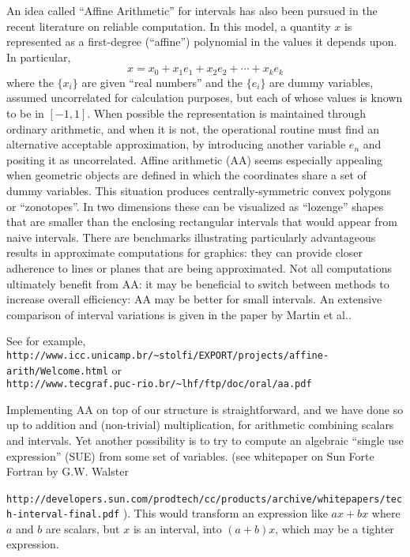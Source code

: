 \documentclass{article}
\begin{document}
An idea called ``Affine Arithmetic'' for intervals has also been
pursued in the recent literature on reliable computation.  In this
model, a quantity $x$ is represented as a first-degree (``affine'')
polynomial in the values it depends upon.  In particular, $$x=x_0+
x_1e_1+x_2e_2+ \cdots + x_k e_k$$ where the $\{x_i\}$ are given ``real
numbers'' and the $\{e_i\}$ are dummy variables, assumed uncorrelated
for calculation purposes, but each of whose values is known to be in
$[-1,1]$.  When possible the representation is maintained through
ordinary arithmetic, and when it is not, the operational routine must
find an alternative acceptable approximation, by introducing another
variable $e_{n}$ and positing it as uncorrelated.  Affine arithmetic
(AA) seems especially appealing when geometric objects are defined in
which the coordinates share a set of dummy variables.  This situation
produces centrally-symmetric convex polygons or ``zonotopes''.  In two
dimensions these can be visualized as ``lozenge'' shapes that are
smaller than the enclosing rectangular intervals that would appear
from naive intervals. There are benchmarks illustrating particularly
advantageous results in approximate computations for graphics: they
can provide closer adherence to lines or planes that are being
approximated. Not all computations ultimately benefit from AA:
it may be beneficial to switch between methods to
increase overall efficiency: AA may be better for small
intervals.  An extensive comparison of interval variations is given in
the paper by Martin et al.\cite{martin}.


See for example,\\
 \verb|http://www.icc.unicamp.br/~stolfi/EXPORT/projects/affine-arith/Welcome.html|
or\\
\verb|http://www.tecgraf.puc-rio.br/~lhf/ftp/doc/oral/aa.pdf|

Implementing AA on top of our structure is straightforward, and we
have done so up to addition and (non-trivial) multiplication, for
arithmetic combining scalars and intervals.  Yet another possibility
is to try to compute an algebraic ``single use expression'' (SUE) from
some set of variables. (see whitepaper on Sun Forte Fortran by
G.W. Walster\\ {\tt
http://developers.sun.com/prodtech/cc/products/archive/whitepapers/tech-interval-final.pdf}
).  This would transform an expression like $ax+bx$ where $a$ and $b$
are scalars, but $x$ is an interval, into $(a+b)x$, which may be a
tighter expression.
\end{document}
